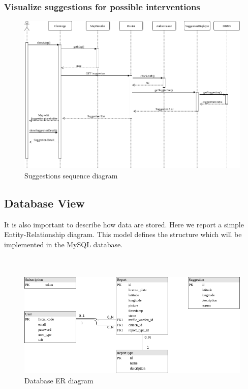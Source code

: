 \documentclass{article}
\begin{document}
\newpage
\subsubsection{Visualize suggestions for possible interventions}
\begin{figure}[!htb]
\centering
	\includegraphics[width=1.0\textwidth]{images/visualize-suggestion-sequence.png}
	\caption{Suggestions sequence diagram}
	\label{fig:visualize-suggestion-sequence}
\end{figure}

\clearpage
\subsection{Database View}
It is also important to describe how data are stored.
Here we report a simple Entity-Relationship diagram. 
This model defines the structure which will be implemented in the MySQL database.\\ \\ \\
\begin{figure}[!htb]
	\centering
		\includegraphics[width=1.0\textwidth]{images/database-diagram.png}
		\caption{Database ER diagram}
	\end{figure}
\end{document}
